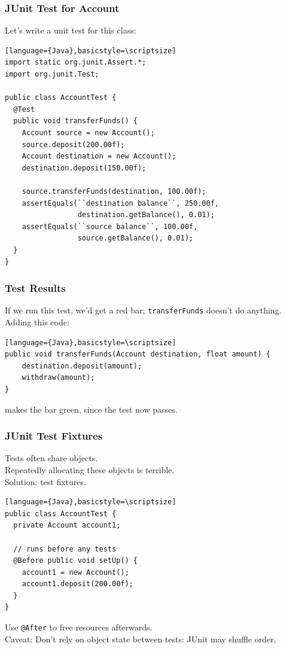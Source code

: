 \begin{frame}[fragile]
\frametitle{JUnit Test for Account}
Let's write a unit test for this class:

\begin{verbatim}[language={Java},basicstyle=\scriptsize]
import static org.junit.Assert.*;
import org.junit.Test;

public class AccountTest {
  @Test
  public void transferFunds() {
    Account source = new Account();
    source.deposit(200.00f);
    Account destination = new Account();
    destination.deposit(150.00f);

    source.transferFunds(destination, 100.00f);
    assertEquals(``destination balance``, 250.00f, 
                 destination.getBalance(), 0.01);
    assertEquals(``source balance``, 100.00f, 
                 source.getBalance(), 0.01);
  }
}
\end{verbatim}
\end{frame}

\begin{frame}[fragile]
\frametitle{Test Results}

\begin{changemargin}{1.5cm}
If we run this test, we'd get a red bar; {\tt transferFunds} doesn't
do anything. Adding this code:

\begin{verbatim}[language={Java},basicstyle=\scriptsize]
public void transferFunds(Account destination, float amount) {
    destination.deposit(amount);
    withdraw(amount);
}
\end{verbatim}
makes the bar green, since the test now passes.
\end{changemargin}
\end{frame}

\begin{frame}[fragile]
\frametitle{JUnit Test Fixtures}

\begin{changemargin}{1cm}
Tests often share objects.\\[1em]

Repeatedly allocating these objects is terrible.\\[1em]

Solution: test fixtures.

\begin{verbatim}[language={Java},basicstyle=\scriptsize]
public class AccountTest {
  private Account account1;

  // runs before any tests
  @Before public void setUp() {
    account1 = new Account(); 
    account1.deposit(200.00f);
  }
}
\end{verbatim}

Use {\tt @After} to free resources afterwards.\\[1em]

\alert{Caveat:} Don't rely on object state between tests: JUnit may shuffle order.
\end{changemargin}
\end{frame}

